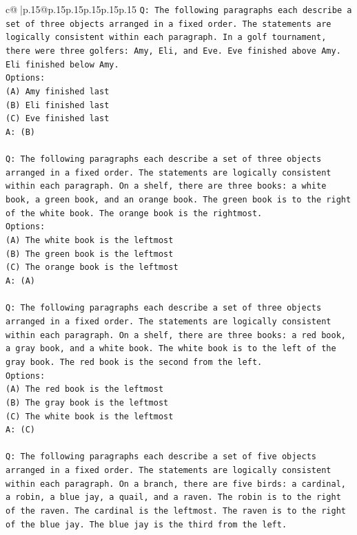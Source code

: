 \documentclass{article}
\begin{document}
{\begin{supertabular}{c@{$\;$}|p{.15\linewidth}@{}p{.15\linewidth}p{.15\linewidth}p{.15\linewidth}p{.15\linewidth}p{.15\linewidth}}
{{{\texttt{Q: The following paragraphs each describe a set of three objects arranged in a fixed order. The statements are logically consistent within each paragraph. In a golf tournament, there were three golfers: Amy, Eli, and Eve. Eve finished above Amy. Eli finished below Amy.} \\
\texttt{Options:} \\
\texttt{(A) Amy finished last} \\
\texttt{(B) Eli finished last} \\
\texttt{(C) Eve finished last} \\
\texttt{A: (B)} \\
\\ 
\texttt{Q: The following paragraphs each describe a set of three objects arranged in a fixed order. The statements are logically consistent within each paragraph. On a shelf, there are three books: a white book, a green book, and an orange book. The green book is to the right of the white book. The orange book is the rightmost.} \\
\texttt{Options:} \\
\texttt{(A) The white book is the leftmost} \\
\texttt{(B) The green book is the leftmost} \\
\texttt{(C) The orange book is the leftmost} \\
\texttt{A: (A)} \\
\\ 
\texttt{Q: The following paragraphs each describe a set of three objects arranged in a fixed order. The statements are logically consistent within each paragraph. On a shelf, there are three books: a red book, a gray book, and a white book. The white book is to the left of the gray book. The red book is the second from the left.} \\
\texttt{Options:} \\
\texttt{(A) The red book is the leftmost} \\
\texttt{(B) The gray book is the leftmost} \\
\texttt{(C) The white book is the leftmost} \\
\texttt{A: (C)} \\
\\ 
\texttt{Q: The following paragraphs each describe a set of five objects arranged in a fixed order. The statements are logically consistent within each paragraph. On a branch, there are five birds: a cardinal, a robin, a blue jay, a quail, and a raven. The robin is to the right of the raven. The cardinal is the leftmost. The raven is to the right of the blue jay. The blue jay is the third from the left.} \\
}}}
\end{supertabular}}
\end{document}
